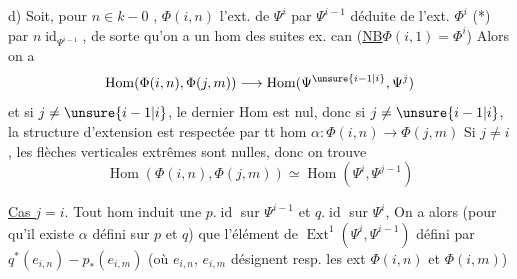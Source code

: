 d) Soit,  pour $n\in k-0$
, $\Phi(i,n)$
l'ext. de  $\Psi^i$ par $\Psi^{i-1}$ déduite de
l'ext. $\Phi^i$ (*) par $n\operatorname{id}_{\Psi^{i-1}}$, de
sorte qu'on a un hom des suites
ex. can
(\uline{NB}\quad $\Phi(i,1)=\Phi^i$)
Alors on a
\[
\operatorname{Hom}(\Phi(i,n),\Phi(j,m))\longrightarrow
\operatorname{Hom}(\Psi^{\unsure{i-1|i}},\Psi^j)
\]
et si $j\neq\unsure{i-1|i}$, le dernier Hom est nul,
donc si $j\neq\unsure{i-1|i}$, la structure d'extension
est respectée par tt hom $\alpha:\Phi(i,n)\longrightarrow\Phi(j,m)$
Si  $j\neq i$, les flèches verticales extrêmes
sont nulles, donc on trouve
\[
\operatorname{Hom}(\Phi(i,n),\Phi(j,m))\simeq
\operatorname{Hom}(\Psi^i,\Psi^{j-1})
\]

\uline{Cas $j=i$}. Tout hom induit une
$p.\operatorname{id}$ sur $\Psi^{i-1}$ et $q.\operatorname{id}$ sur $\Psi^i$,
On a alors (pour qu'il existe $\alpha$ défini sur
$p$ et $q$) que l'élément de $\operatorname{Ext}^1(\Psi^i,\Psi^{i-1})$
défini par $q^*(e_{i,n})-p_*(e_{i,m})$ (où
$e_{i,n}$, $e_{i,m}$ désignent resp. les ext $\Phi(i,n)$ et $\Phi(i,m)$)
